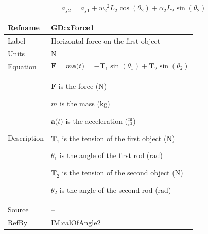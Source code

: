 \documentclass[12pt]{article}
\begin{document}
\begin{displaymath}
{a_{\text{y}2}}={a_{\text{y}1}}+{w_{2}}^{2} {L_{2}} \cos\left({θ_{2}}\right)+{α_{2}} {L_{2}} \sin\left({θ_{2}}\right)
\end{displaymath}
\vspace{\baselineskip}
\noindent
\begin{minipage}{\textwidth}
\begin{tabular}{>{\raggedright}p{}>{\raggedright\arraybackslash}p{}}
\toprule \textbf{Refname} & \textbf{GD:xForce1}
\label{GD:xForce1}
\\ \midrule
Label & Horizontal force on the first object
        
\\ \midrule
Units & ${\text{N}}$
        
\\ \midrule
Equation & \begin{displaymath}
           \symbf{F}=m \symbf{a}\text{(}t\text{)}=-{\symbf{T}_{1}} \sin\left({θ_{1}}\right)+{\symbf{T}_{2}} \sin\left({θ_{2}}\right)
           \end{displaymath}
\\ \midrule
Description & \begin{symbDescription}
              \item{$\symbf{F}$ is the force (${\text{N}}$)}
              \item{$m$ is the mass (${\text{kg}}$)}
              \item{$\symbf{a}\text{(}t\text{)}$ is the acceleration ($\frac{\text{m}}{\text{s}^{2}}$)}
              \item{${\symbf{T}_{1}}$ is the tension of the first object (${\text{N}}$)}
              \item{${θ_{1}}$ is the angle of the first rod (${\text{rad}}$)}
              \item{${\symbf{T}_{2}}$ is the tension of the second object (${\text{N}}$)}
              \item{${θ_{2}}$ is the angle of the second rod (${\text{rad}}$)}
              \end{symbDescription}
\\ \midrule
Source & --
         
\\ \midrule
RefBy & \hyperref[IM:calOfAngle2]{IM:calOfAngle2}
        
\\ \bottomrule
\end{tabular}
\end{minipage}
\end{document}
